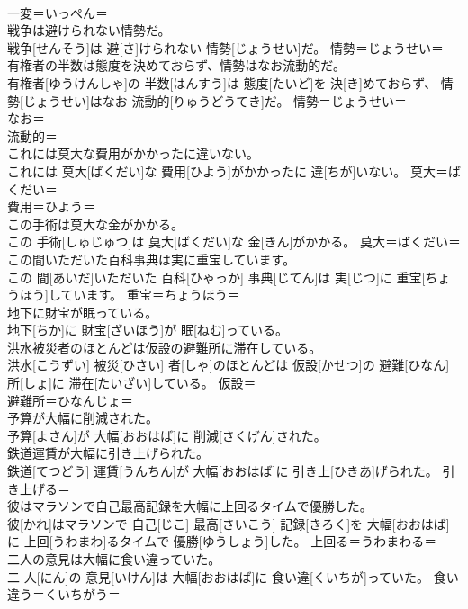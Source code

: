 \documentclass[8pt]{extreport}
\begin{document}
\begin{CJK}{UTF8}{min}
\\	一変＝いっぺん＝ 
\\	戦争は避けられない情勢だ。	
\\	戦争[せんそう]は 避[さ]けられない 情勢[じょうせい]だ。	情勢＝じょうせい＝ 
\\	有権者の半数は態度を決めておらず、情勢はなお流動的だ。	
\\	有権者[ゆうけんしゃ]の 半数[はんすう]は 態度[たいど]を 決[き]めておらず、 情勢[じょうせい]はなお 流動的[りゅうどうてき]だ。	情勢＝じょうせい＝ 
\\	なお＝ 
\\	流動的＝ 
\\	これには莫大な費用がかかったに違いない。	
\\	これには 莫大[ばくだい]な 費用[ひよう]がかかったに 違[ちが]いない。	莫大＝ばくだい＝ 
\\	費用＝ひよう＝ 
\\	この手術は莫大な金がかかる。	
\\	この 手術[しゅじゅつ]は 莫大[ばくだい]な 金[きん]がかかる。	莫大＝ばくだい＝ 
\\	この間いただいた百科事典は実に重宝しています。	
\\	この 間[あいだ]いただいた 百科[ひゃっか] 事典[じてん]は 実[じつ]に 重宝[ちょうほう]しています。	重宝＝ちょうほう＝ 
\\	地下に財宝が眠っている。	
\\	地下[ちか]に 財宝[ざいほう]が 眠[ねむ]っている。	
\\	洪水被災者のほとんどは仮設の避難所に滞在している。	
\\	洪水[こうずい] 被災[ひさい] 者[しゃ]のほとんどは 仮設[かせつ]の 避難[ひなん] 所[しょ]に 滞在[たいざい]している。	仮設＝ 
\\	避難所＝ひなんじょ＝ 
\\	予算が大幅に削減された。	
\\	予算[よさん]が 大幅[おおはば]に 削減[さくげん]された。	
\\	鉄道運賃が大幅に引き上げられた。	
\\	鉄道[てつどう] 運賃[うんちん]が 大幅[おおはば]に 引き上[ひきあ]げられた。	引き上げる＝ 
\\	彼はマラソンで自己最高記録を大幅に上回るタイムで優勝した。	
\\	彼[かれ]はマラソンで 自己[じこ] 最高[さいこう] 記録[きろく]を 大幅[おおはば]に 上回[うわまわ]るタイムで 優勝[ゆうしょう]した。	上回る＝うわまわる＝ 
\\	二人の意見は大幅に食い違っていた。	
\\	二 人[にん]の 意見[いけん]は 大幅[おおはば]に 食い違[くいちが]っていた。	食い違う＝くいちがう＝ 

\end{CJK}
\end{document}
